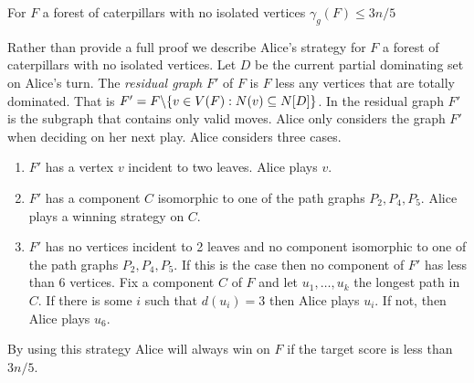 \begin{theorem}\label{thm:domcat}
    For $F$ a forest of caterpillars with no isolated vertices 
    $\gamma_g(F)\leq 3n/5$ 
\end{theorem}
Rather than provide a full proof we describe Alice's strategy for $F$ a forest of caterpillars with no isolated vertices. 
    Let $D$ be the current partial dominating set on Alice's turn. The \textit{residual graph} $F'$ of $F$ is $F$ less any vertices that are totally dominated. That is $F'=F\backslash\{v\in V(F): N(v)\subseteq N[D]\}$. In the residual graph $F'$ is the subgraph that contains only valid moves. Alice only considers the graph $F'$ when deciding on her next play. Alice considers three cases.
    \begin{enumerate}        
    \item $F'$ has a vertex $v$ incident to two leaves. Alice plays $v$. 
    
    \item $F'$ has a component $C$ isomorphic to one of the path graphs $P_2,P_4,P_5$. Alice plays a winning strategy on $C$. 
    
    \item $F'$ has no vertices incident to 2 leaves and no component isomorphic to one of the path graphs $P_2,P_4,P_5$. If this is the case then no component of $F'$ has less than 6 vertices. Fix a component $C$ of $F$ and let $u_1,\dots,u_k$ the longest path in $C$. If there is some $i$ such that $d(u_i)=3$ then Alice plays $u_i$. If not, then Alice plays $u_6$.    
    \end{enumerate}
By using this strategy Alice will always win on $F$ if the target score is less than $3n/5$.
    
